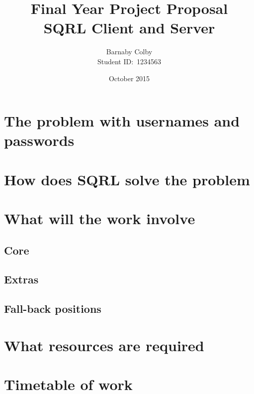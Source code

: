 \documentclass[a4paper]{article}
\begin{document}
\title{Final Year Project Proposal\\SQRL Client and Server}
\author{Barnaby Colby\\
Student ID:\ 1234563}
\date{October 2015}
\maketitle



\section*{The problem with usernames and passwords} 
\section*{How does SQRL solve the problem}
\section*{What will the work involve}
    \subsection*{Core}
    \subsection*{Extras}
    \subsection*{Fall-back positions}
\section*{What resources are required}
\section*{Timetable of work}
\end{document}
